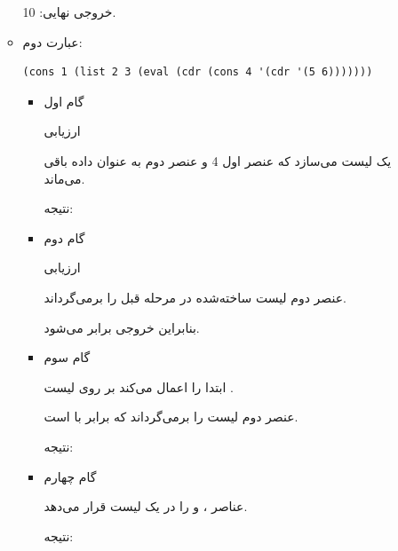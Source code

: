 \documentclass[11pt, a4paper, oneside]{article}
\newcounter{itemadded}
\let\LaTeXStandardEnumerateBegin\enumerate
\let\LaTeXStandardEnumerateEnd\endenumerate
\renewenvironment{enumerate}{%
	\LaTeXStandardEnumerateBegin%
	\setcounter{itemadded}{0}
}{%
	\LaTeXStandardEnumerateEnd%
}%
\begin{document}
\begin{itemize}
\begin{itemize}
\begin{enumerate}
\begin{itemize}
							\end{itemize}
							خروجی نهایی: 10.
							
							
							\item عبارت دوم:
							\begin{latin}
								\begin{lstlisting}[caption={\lr{Q2 A 2}}]
(cons 1 (list 2 3 (eval (cdr (cons 4 '(cdr '(5 6)))))))

								\end{lstlisting}
							\end{latin}
							
							\begin{itemize}
							
							\item {\large گام اول} \par
							{\normalsize ارزیابی } \par
							{\normalsize {} یک لیست می‌سازد که عنصر اول 4 و عنصر دوم  به عنوان داده باقی می‌ماند.} \par
							{\normalsize نتیجه: }
							
							\item {\large گام دوم} \par
							{\normalsize ارزیابی } \par
							{\normalsize {} عنصر دوم لیست ساخته‌شده در مرحله قبل را برمی‌گرداند.} \par
							{\normalsize بنابراین خروجی  برابر  می‌شود.} \par
							
							\item {\large گام سوم} \par
							{\normalsize {} ابتدا  را اعمال می‌کند بر روی لیست .} \par
							{\normalsize {} عنصر دوم لیست را برمی‌گرداند که برابر با  است.} \par
							{\normalsize نتیجه: } \par
							
							\item {\large گام چهارم} \par
							{\normalsize {} عناصر ،  و  را در یک لیست قرار می‌دهد.} \par
							{\normalsize نتیجه: } \par
							

\end{itemize}
\end{enumerate}
\end{itemize}
\end{itemize}
\end{document}
